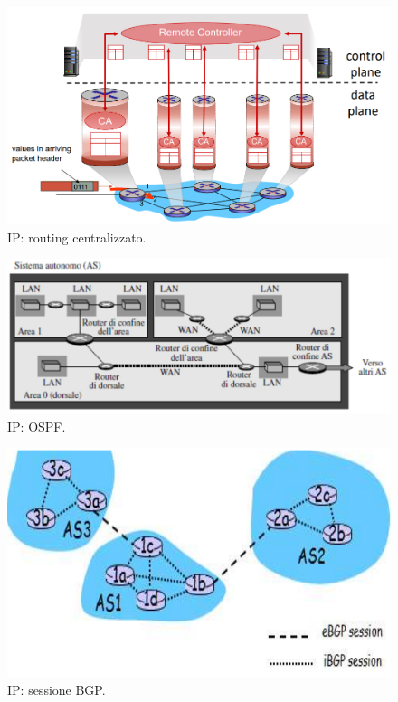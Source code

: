 \documentclass[11pt, italian, openany]{book}
\begin{document}
\begin{sloppypar}
\begin{figure}[!h]
	\centering
	\includegraphics[scale=0.35]{images/ip-routing-centralizzato.png}
	\caption{IP: routing centralizzato.}
	\label{fig:ip-routing-centralizzato}
\end{figure}

\pagebreak

\begin{figure}[!h]
	\centering
	\includegraphics[scale=0.5]{images/ospf.png}
	\caption{IP: OSPF.}
	\label{fig:ospf}
\end{figure}

\begin{figure}[!h]
	\centering
	\includegraphics[scale=0.5]{images/ip-sessione-bgp.png}
	\caption{IP: sessione BGP.}
	\label{fig:ip-sessione-bgp}
\end{figure}


\end{sloppypar}
\end{document}
